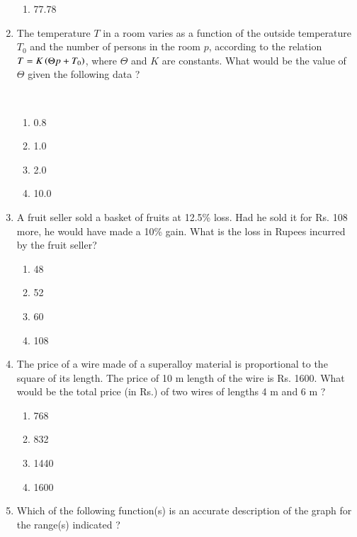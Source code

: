 \documentclass[journal]{IEEEtran}
\begin{document}
\begin{enumerate}
\begin{enumerate}
    \item 77.78 \\
\end{enumerate}
\item The temperature $T$ in a room varies as a function of the outside temperature $T_0$ and the number of persons in the room $p$, according to the relation $T = K \left(\Theta p + T_0\right)$, where $\Theta$ and $K$ are constants. What would be the value of $\Theta$ given the following data ?
\begin{table}[h!]
  \centering
  
 \end{table}\\
 \begin{enumerate}
    \item 0.8
    \item 1.0
    \item 2.0
    \item 10.0 \\
\end{enumerate}
\item A fruit seller sold a basket of fruits at 12.5\% loss. Had he sold it for Rs. 108 more, he would have made a 10\% gain. What is the loss in Rupees incurred by the fruit seller?
\begin{enumerate}
    \item 48
    \item 52
     \item 60
    \item 108 \\
\end{enumerate}
\item The price of a wire made of a superalloy material is proportional to the square of its length. The price of 10 m length of the wire is Rs. 1600. What would be the total price (in Rs.) of two wires of lengths 4 m and 6 m ?
\begin{enumerate}
    \item 768
    \item 832
    \item 1440
    \item 1600 \\
\end{enumerate}
\item Which of the following function(s) is an accurate description of the graph for the range(s) indicated ?
\begin{figure}[!ht]
\centering
\resizebox{0.4\textwidth}{!}{%

}%
\end{figure}

\end{enumerate}
\end{document}
